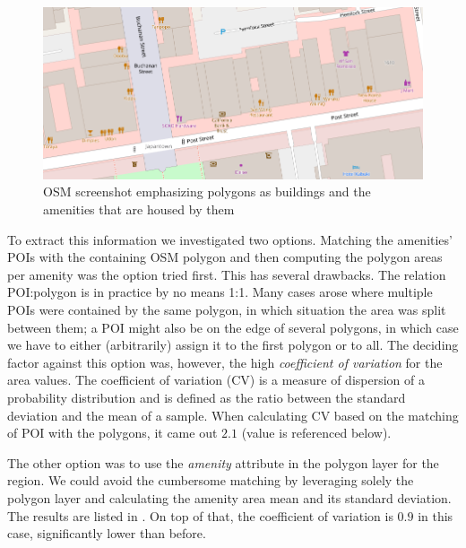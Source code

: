 \begin{figure}[!ht]
	\centering
	\includegraphics[width=\textwidth]{graphics/amenity_polygons4.png}
	\caption{OSM screenshot emphasizing polygons as buildings and the amenities that are housed by them}
	\label{fig:amenity_polygons}
\end{figure}

To extract this information we investigated two options.
Matching the amenities' POIs with the containing OSM polygon and then computing the polygon areas per amenity was the option tried first. 
This has several drawbacks. 
The relation POI:polygon is in practice by no means 1:1.
Many cases arose where multiple POIs were contained by the same polygon, in which situation the area was split between them; a POI might also be on the edge of several polygons, in which case we have to either (arbitrarily) assign it to the first polygon or to all. 
The deciding factor against  this option was, however, the high \textit{coefficient of variation} for the area values. 
The coefficient of variation (CV) is a measure of dispersion of a probability distribution and is defined as the ratio between the standard deviation and the mean of a sample. %
When calculating CV based on the matching of POI with the polygons, it came out $2.1$ (value is referenced below).


The other option was to use the \textit{amenity} attribute in the polygon layer for the region. 
We could avoid the cumbersome matching by leveraging solely the polygon layer and calculating the amenity area mean and its standard deviation. The results are listed in . 
On top of that, the coefficient of variation is $0.9$ in this case, significantly lower than before. 

